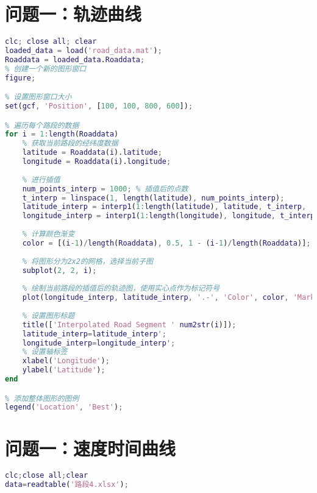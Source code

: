\documentclass[withoutpreface,bwprint]{cumcmthesis} %
\begin{document}
\begin{appendices}
 \section{问题一：轨迹曲线}
\begin{lstlisting}[language=matlab]
clc; close all; clear
loaded_data = load('road_data.mat');
Roaddata = loaded_data.Roaddata;
% 创建一个新的图形窗口
figure;

% 设置图形窗口大小
set(gcf, 'Position', [100, 100, 800, 600]);

% 遍历每个路段的数据
for i = 1:length(Roaddata)
    % 获取当前路段的经纬度数据
    latitude = Roaddata(i).latitude;
    longitude = Roaddata(i).longitude;
    
    % 进行插值
    num_points_interp = 1000; % 插值后的点数
    t_interp = linspace(1, length(latitude), num_points_interp);
    latitude_interp = interp1(1:length(latitude), latitude, t_interp, 'spline');
    longitude_interp = interp1(1:length(longitude), longitude, t_interp, 'spline');
    
    % 计算颜色渐变
    color = [(i-1)/length(Roaddata), 0.5, 1 - (i-1)/length(Roaddata)];
    
    % 将图形分为2x2的网格，选择当前子图
    subplot(2, 2, i);
    
    % 绘制当前路段的插值后的轨迹图，使用实心点作为标记符号
    plot(longitude_interp, latitude_interp, '.-', 'Color', color, 'MarkerSize', 5, 'DisplayName', ['Road Segment ' num2str(i)]);
    
    % 设置图形标题
    title(['Interpolated Road Segment ' num2str(i)]);
    latitude_interp=latitude_interp';
    longitude_interp=longitude_interp';
    % 设置轴标签
    xlabel('Longitude');
    ylabel('Latitude');
end

% 添加整体图形的图例
legend('Location', 'Best');

 \end{lstlisting}

\section{问题一：速度时间曲线}
\begin{lstlisting}[language=matlab]
clc;close all;clear
data=readtable('路段4.xlsx');


\end{lstlisting}
\end{appendices}
\end{document}
